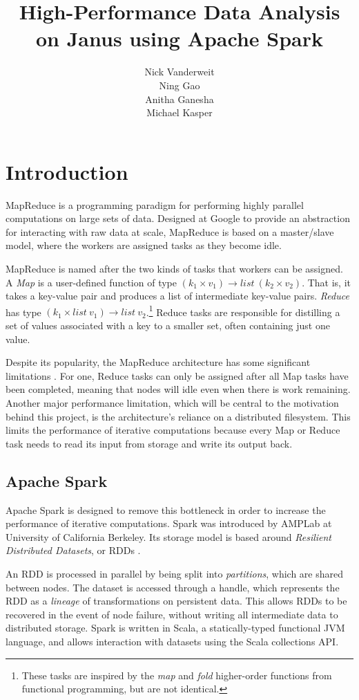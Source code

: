 \documentclass{article}
\title{High-Performance Data Analysis on Janus using Apache Spark}
\author{Nick Vanderweit \\
        Ning Gao \\
        Anitha Ganesha \\
        Michael Kasper}
\begin{document}
\maketitle

\section*{Introduction}
MapReduce \citep{dean-mapreduce} is a programming paradigm for performing highly
parallel computations on large sets of data. Designed at Google to provide an
abstraction for interacting with raw data at scale, MapReduce is based on
a master/slave model, where the workers are assigned tasks as they become idle.

MapReduce is named after the two kinds of tasks that workers can be assigned.
A \emph{Map} is a user-defined function of type
$(k_1 \times v_1) \rightarrow list \: (k_2 \times v_2)$.
That is, it takes a key-value pair and produces a list of
intermediate key-value pairs. \emph{Reduce} has type
$(k_1 \times list \: v_1) \rightarrow list \: v_2$.\footnote{
These tasks are inspired by the \emph{map} and \emph{fold}
higher-order functions from functional programming, but are not identical.}
Reduce tasks are responsible for distilling a set of values associated with
a key to a smaller set, often containing just one value.

Despite its popularity, the MapReduce architecture has some significant
limitations \citep{lee-survey}. For one, Reduce tasks can only be assigned after
all Map tasks have been completed, meaning that nodes will idle even when there
is work remaining. Another major performance limitation, which will be central
to the motivation behind this project, is the architecture's reliance on a
distributed filesystem. This limits the performance of iterative computations
because every Map or Reduce task needs to read its input from storage and write
its output back.

\subsection*{Apache Spark}
Apache Spark \citep{zaharia} is designed to remove this bottleneck in order to
increase the performance of iterative computations. Spark was introduced by
AMPLab at University of California Berkeley. Its storage model is
based around \emph{Resilient Distributed Datasets}, or
RDDs \citep{zaharia_rdd}.

An RDD is processed in parallel by being split into \emph{partitions}, which
are shared between nodes. The dataset is accessed through a handle, which
represents the RDD as a \emph{lineage} of transformations on persistent data.
This allows RDDs to be recovered in the event of node failure, without writing
all intermediate data to distributed storage. Spark is written in Scala,
a statically-typed functional JVM language, and allows interaction with datasets
using the Scala collections API.
\end{document}
